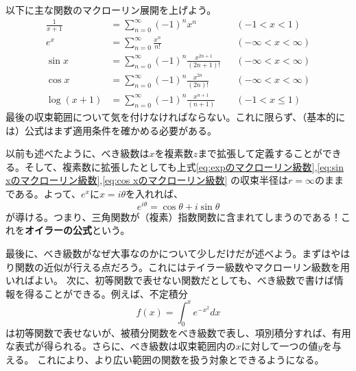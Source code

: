 \documentclass[a4j,dvipdfmx]{jsarticle}
\begin{document}
                以下に主な関数のマクローリン展開を上げよう。
                \begin{align}
                    \frac{1}{x+1}&=\sum_{n=0}^{\infty}(-1)^nx^n \quad &&(-1<x<1)\label{eq:1/x+1のマクローリン級数}\\
                    e^x &= \sum_{n=0}^{\infty}\frac{x^n}{n!} &&(-\infty<x<\infty)\label{eq:expのマクローリン級数}\\
                    \sin x &= \sum_{n=0}^{\infty}(-1)^n\frac{x^{2n+1}}{(2n+1)!} &&(-\infty<x<\infty)\label{eq:sin xのマクローリン級数}\\
                    \cos x &= \sum_{n=0}^{\infty}(-1)^n\frac{x^{2n}}{(2n)!} &&(-\infty<x<\infty)\label{eq:cos xのマクローリン級数}\\
                    \log(x+1) &= \sum_{n=0}^{\infty}(-1)^n\frac{x^{n+1}}{(n+1)} &&(-1<x\leq 1)\label{eq:log x+1のマクローリン級数}
                \end{align}
                最後の収束範囲について気を付けなければならない。これに限らず、（基本的には）公式はまず適用条件を確かめる必要がある。

                以前も述べたように、べき級数は$x$を複素数$z$まで拡張して定義することができる。そして、複素数に拡張したとしても上式\eqref{eq:expのマクローリン級数},\eqref{eq:sin xのマクローリン級数},\eqref{eq:cos xのマクローリン級数}
                の収束半径は$r=\infty$のままである。よって、$e^x$に$x=i\theta$を入れれば、
                \begin{equation}
                    e^{i\theta}=\cos\theta + i\sin\theta
                \end{equation}
                が導ける。つまり、三角関数が（複素）指数関数に含まれてしまうのである！これを\textbf{オイラーの公式}という。

                最後に、べき級数がなぜ大事なのかについて少しだけだが述べよう。まずはやはり関数の近似が行える点だろう。これにはテイラー級数やマクローリン級数を用いればよい。
                次に、初等関数で表せない関数だとしても、べき級数で書けば情報を得ることができる。例えば、不定積分
                \begin{equation*}
                    f(x)=\int_{0}^{x}e^{-x^2}dx
                \end{equation*}
                は初等関数で表せないが、被積分関数をべき級数で表し、項別積分すれば、有用な表式が得られる。さらに、べき級数は収束範囲内の$x$に対して一つの値$y$を与える。
                これにより、より広い範囲の関数を扱う対象とできるようになる。
                \clearpage
\end{document}

